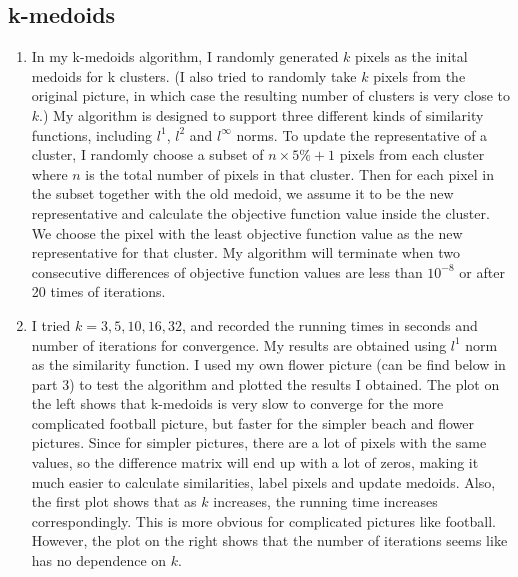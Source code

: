 \documentclass[twoside,10pt]{article}
\begin{document}
\subsection{k-medoids}
\begin{enumerate}
    \item In my k-medoids algorithm, I randomly generated $k$ pixels as the inital medoids for k clusters. (I also tried to randomly take $k$ pixels from the original picture, in which case the resulting number of clusters is very close to $k$.) My algorithm is designed to support three different kinds of similarity functions, including $l^1$, $l^2$ and $l^{\infty}$ norms. To update the representative of a cluster, I randomly choose a subset of $n\times 5\% + 1$ pixels from each cluster where $n$ is the total number of pixels in that cluster. Then for each pixel in the subset together with the old medoid, we assume it to be the new representative and calculate the objective function value inside the cluster. We choose the pixel with the least objective function value as the new representative for that cluster. My algorithm will terminate when two consecutive differences of objective function values are less than $10^{-8}$ or after 20 times of iterations. 
    
    \item I tried $k = 3,5,10,16,32$, and recorded the running times in seconds and number of iterations for convergence. My results are obtained using $l^1$ norm as the similarity function. I used my own flower picture (can be find below in part 3) to test the algorithm and plotted the results I obtained. The plot on the left shows that k-medoids is very slow to converge for the more complicated football picture, but faster for the simpler beach and flower pictures. Since for simpler pictures, there are a lot of pixels with the same values, so the difference matrix will end up with a lot of zeros, making it much easier to calculate similarities, label pixels and update medoids. Also, the first plot shows that as $k$ increases, the running time increases correspondingly. This is more obvious for complicated pictures like football. However, the plot on the right shows that the number of iterations seems like has no dependence on $k$. 
    

\end{enumerate}
\end{document}
